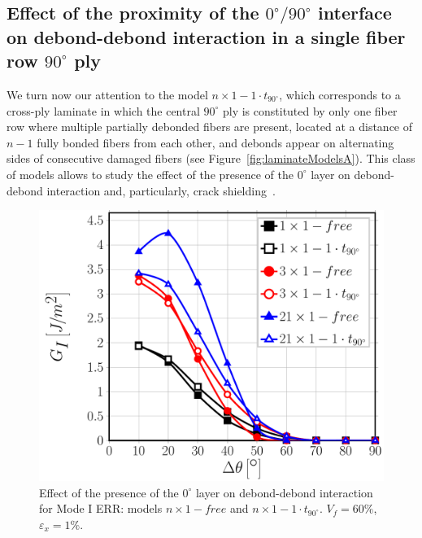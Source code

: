 \documentclass[review]{elsarticle}
\begin{document}
\subsection{Effect of the proximity of the $0^{\circ}/90^{\circ}$ interface on debond-debond interaction in a single fiber row $90^{\circ}$ ply}\label{subsec:debonddebondinter}

We turn now our attention to the model $n\times 1-1\cdot t_{90^{\circ}}$, which corresponds to a cross-ply laminate in which the central $90^{\circ}$ ply is constituted by only one fiber row where multiple partially debonded fibers are present, located at a distance of $n-1$ fully bonded fibers from each other, and debonds appear on alternating sides of consecutive damaged fibers (see Figure~\ref{fig:laminateModelsA}). This class of models allows to study the effect of the presence of the $0^{\circ}$ layer on debond-debond interaction and, particularly, crack shielding~\cite{Garcia2015,DiStasio2019}.

\begin{figure}[!h]
\centering
\includegraphics[width=\textwidth]{nx1-1-vf60-GI.pdf}
\caption{Effect of the presence of the $0^{\circ}$ layer on debond-debond interaction for Mode I ERR: models $n\times 1-free$ and $n\times 1-1\cdot t_{90^{\circ}}$. $V_{f}=60\%$, $\varepsilon_{x}=1\%$.}\label{fig:debonddebondGI}
\end{figure}
\end{document}
